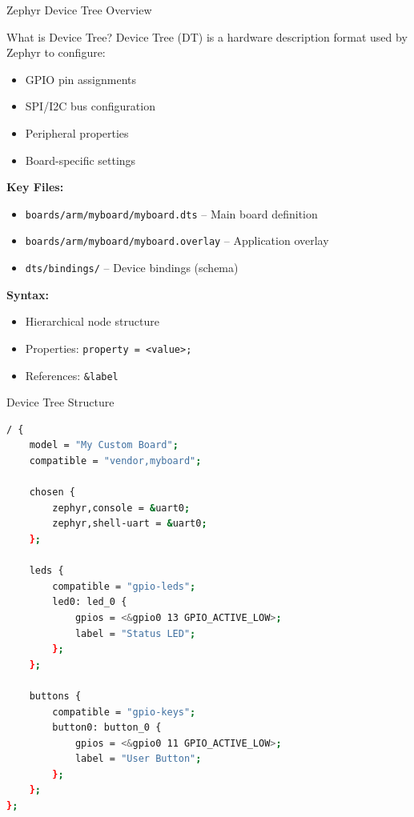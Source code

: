 \documentclass{beamer}
\begin{document}
\begin{frame}{Zephyr Device Tree Overview}
\begin{block}{What is Device Tree?}
Device Tree (DT) is a hardware description format used by Zephyr to configure:
\begin{itemize}
    \item GPIO pin assignments
    \item SPI/I2C bus configuration
    \item Peripheral properties
    \item Board-specific settings
\end{itemize}
\end{block}

\vspace{0.3cm}

\textbf{Key Files:}
\begin{itemize}
    \item \texttt{boards/arm/myboard/myboard.dts} -- Main board definition
    \item \texttt{boards/arm/myboard/myboard.overlay} -- Application overlay
    \item \texttt{dts/bindings/} -- Device bindings (schema)
\end{itemize}

\vspace{0.3cm}

\textbf{Syntax:}
\begin{itemize}
    \item Hierarchical node structure
    \item Properties: \texttt{property = <value>;}
    \item References: \texttt{\&label}
\end{itemize}
\end{frame}

\begin{frame}[fragile]{Device Tree Structure}
\begin{lstlisting}[language=bash, caption={Example Device Tree}]
/ {
    model = "My Custom Board";
    compatible = "vendor,myboard";

    chosen {
        zephyr,console = &uart0;
        zephyr,shell-uart = &uart0;
    };

    leds {
        compatible = "gpio-leds";
        led0: led_0 {
            gpios = <&gpio0 13 GPIO_ACTIVE_LOW>;
            label = "Status LED";
        };
    };

    buttons {
        compatible = "gpio-keys";
        button0: button_0 {
            gpios = <&gpio0 11 GPIO_ACTIVE_LOW>;
            label = "User Button";
        };
    };
};
\end{lstlisting}
\end{frame}
\end{document}
